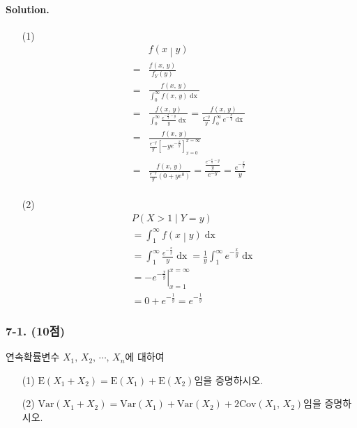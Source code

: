 \paragraph{Solution.}
\begin{itemize}
	\item [(1)] {
		\begin{align*}
			& f\left(x\middle|y\right) \\
			=& \frac{f\left(x,\,y\right)}{f_Y\left(y\right)} \\
			=& \frac{f\left(x,\,y\right)}{\displaystyle \int_0^\infty f\left(x,\,y\right) \mathop{dx}} \\
			=& \frac{f\left(x,\,y\right)}{\displaystyle \int_0^\infty \frac{e^{-\frac{x}{y} - y}}{y} \mathop{dx}}
			= \frac{f\left(x,\,y\right)}{\displaystyle \frac{e^{-y}}{y}\int_0^\infty e^{-\frac{x}{y}} \mathop{dx}} \\
			=& \frac{f\left(x,\,y\right)}{\displaystyle \frac{e^{-y}}{y} \left[-ye^{-\frac{x}{y}}\right]_{x=0}^{x=\infty}} \\
			=& \frac{f\left(x,\,y\right)}{\displaystyle \frac{e^{-y}}{y} \left(0 + ye^0\right)}
			= \frac{\frac{e^{-\frac{x}{y} - y}}{y}}{e^{-y}} = \frac{e^{-\frac{x}{y}}}{y}\\
		\end{align*}
	}
    \item [(2)] {
		\begin{align*}
			& P\left(X>1\middle|Y=y\right) \\
			&= \int_1^\infty f\left(x\middle|y\right) \mathop{dx} \\
			&= \int_1^\infty \frac{e^{-\frac{x}{y}}}{y} \mathop{dx}
			= \frac{1}{y} \int_1^\infty e^{-\frac{x}{y}} \mathop{dx} \\
			&= \left.-e^{-\frac{x}{y}}\right|_{x=1}^{x=\infty} \\
			&= 0 + e^{-\frac{1}{y}} = e^{-\frac{1}{y}}
		\end{align*}
	}
\end{itemize} 

\subsubsection{7-1. (10점)} 연속확률변수 $X_1,\,X_2,\,\cdots,\,X_n$에 대하여
\begin{itemize}
	\item [(1)] $\mathrm{E}\left(X_1 + X_2\right) = \mathrm{E}\left(X_1\right) + \mathrm{E}\left(X_2\right)$임을 증명하시오.
	\item [(2)] $\mathrm{Var}\left(X_1 + X_2\right) = \mathrm{Var}\left(X_1\right) + \mathrm{Var}\left(X_2\right) + 2\mathrm{Cov}\left(X_1,\,X_2\right)$임을 증명하시오.
\end{itemize}

